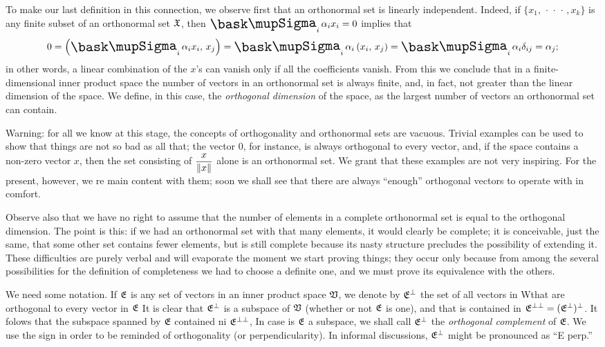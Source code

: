 To make our last definition in this connection, we observe first that an
orthonormal set is linearly independent. 
Indeed, if \(\{x_1, \, \cdot\, \cdot\, \cdot\,, x_k\}\) is any finite subset of an orthonormal set \(\frak{X}\), then \(\sumx_i \alpha_i x_i = 0\) implies that
\begin{equation*}
    0 = \innerprod{\sumx_i \alpha_i x_i}{x_j} = \sumx_i \alpha_i \innerprod{x_i}{x_j} = \sumx_i \alpha_i \delta_{ij} = \alpha_j;
\end{equation*}
in other words, a linear combination of the \(x\)'s can vanish only if all the
coefficients vanish. From this we conclude that in a finite-dimensional inner
product space the number of vectors in an orthonormal set is always finite, and,
in fact, not greater than the linear dimension of the space. We define, in this
case, the \emph{orthogonal dimension} of the space, as the largest number of
vectors an orthonormal set can contain.

Warning: for all we know at this stage, the concepts of orthogonality and
orthonormal sets are vacuous. Trivial examples can be used to show that things
are not so bad as all that; the vector \(0\), for instance, is always orthogonal
to every vector, and, if the space contains a non-zero vector \(x\), then the set consisting of \(\displaystyle\frac{x}{\left\lVert x\right\rVert}\) alone is an orthonormal
set. We grant that these examples are not very inspiring. For the present,
however, we re main content with them; soon we shall see that there are always
``enough'' orthogonal vectors to operate with in comfort.

Observe also that we have no right to assume that the number of elements in a
complete orthonormal set is equal to the orthogonal dimension. The point is
this: if we had an orthonormal set with that many elements, it would clearly
be complete; it is conceivable, just the same, that some other set contains fewer
elements, but is still complete because its nasty structure precludes the
possibility of extending it. These difficulties are purely verbal and will
evaporate the moment we start proving things; they occur only because from among
the several possibilities for the definition of completeness we had to choose a
definite one, and we must prove its equivalence with the others.

We need some notation. If \(\frak{E}\) is any set of vectors in an inner product
space \(\mathfrak{V}\), we denote by \(\frak{E}^{\perp}\) the set of all vectors in
Wthat are orthogonal to every vector in \(\frak{E}\) It is clear that
\(\frak{E}^{\perp}\) is a subspace of \(\mathfrak{V}\) (whether or not \(\frak{E}\) is
one), and that is contained in \(\frak{E}^{\perp\perp} =
(\frak{E}^{\perp})^{\perp}\). It folows that the subspace spanned by
\(\frak{E}\) contained ni \(\frak{E}^{\perp\perp}\), In case is \(\frak{E}\) a
subspace, we shall call \(\frak{E}^{\perp}\) the \emph{orthogonal complement} of
\(\frak{E}\). We use the sign in order to be reminded of orthogonality (or
perpendicularity). In informal discussions, \(\frak{E}^{\perp}\) might be
pronounced as ``E perp.''

